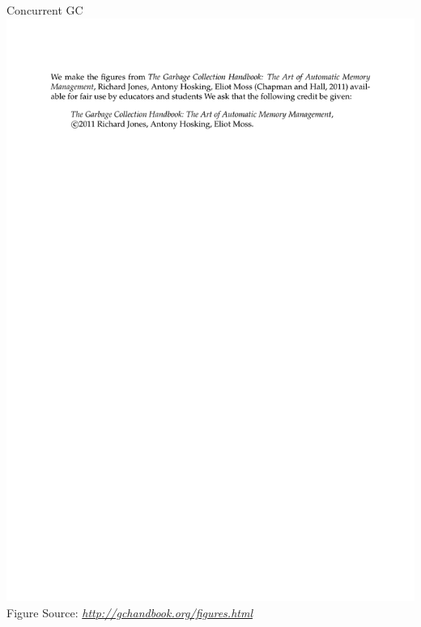 \documentclass[
14pt,
aspectratio=169,
usenames,
dvipsnames,
x11names]{beamer}
\newcommand{\src}[1]{\scriptsize Figure Source: \textit{#1}}
\begin{document}
\begin{frame}{Concurrent GC}
  \centering
  \includegraphics[page=75,trim=2cm 12cm 2cm 4.5cm,clip,height=.7\textheight]{gchandbookfigures}\\
  \src{\url{http://gchandbook.org/figures.html}}
\end{frame}
\end{document}
